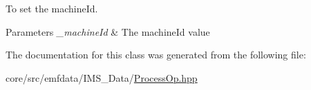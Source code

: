 To set the machineId. 


\begin{DoxyParams}{Parameters}
{\em \_\-machineId} & The machineId value \\
\hline
\end{DoxyParams}


The documentation for this class was generated from the following file:\begin{DoxyCompactItemize}
\item 
core/src/emfdata/IMS\_\-Data/\hyperlink{ProcessOp_8hpp}{ProcessOp.hpp}\end{DoxyCompactItemize}
